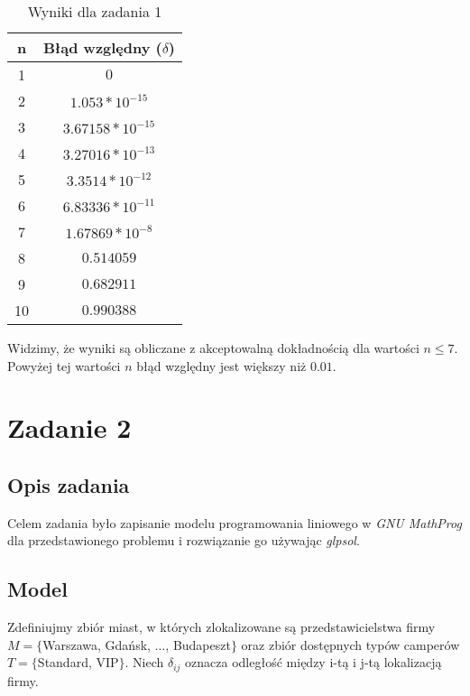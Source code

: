 \documentclass{article}
\begin{document}
    \begin{table}[H]
		\begin{center}
			\begin{tabular}{c||c}
				\textbf{n} & \textbf{Błąd względny ($\delta$)} \\
				\hline
                1 & $0$ \\
                2 & $1.053 * 10^{-15}$ \\
                3 & $3.67158 * 10^{-15}$ \\
                4 & $3.27016 * 10^{-13}$ \\
                5 & $3.3514 * 10^{-12}$ \\
                6 & $6.83336 * 10^{-11}$ \\
                7 & $1.67869 * 10^{-8}$ \\
                8 & $0.514059$ \\
                9 & $0.682911$ \\
                10 & $0.990388$ \\
			\end{tabular}
            \caption{Wyniki dla zadania 1}
            \label{tab1}
		\end{center}
	\end{table}	

    Widzimy, że wyniki są obliczane z akceptowalną dokładnością dla wartości $n \leq 7$. Powyżej tej wartości $n$ błąd względny jest większy niż $0.01$.


	\section{Zadanie 2}
	\subsection{Opis zadania}

    Celem zadania było zapisanie modelu programowania liniowego w \textit{GNU MathProg} dla przedstawionego problemu i rozwiązanie go używając \textit{glpsol}. 
    
    \subsection{Model}

        Zdefiniujmy zbiór miast, w których zlokalizowane są przedstawicielstwa firmy $M = \{$Warszawa, Gdańsk, $\dots$, Budapeszt$\}$ oraz zbiór dostępnych typów camperów 
        $T = \{$Standard, VIP$\}$. Niech $\delta_{ij}$ oznacza odległość między i-tą i j-tą lokalizacją firmy.
\end{document}
